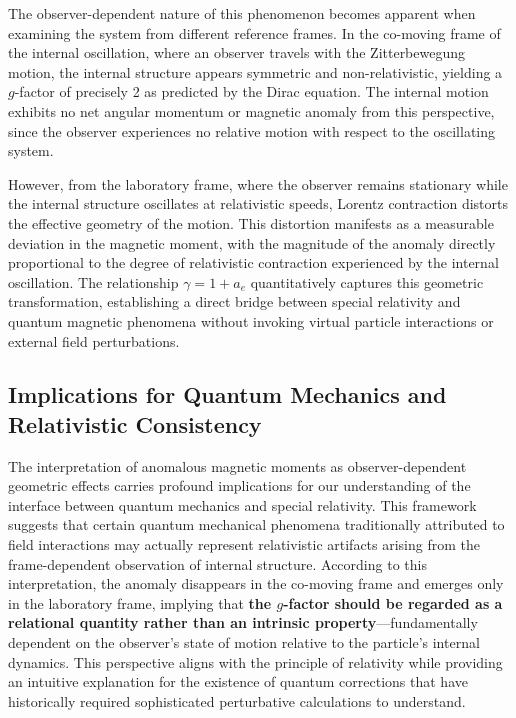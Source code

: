 \documentclass[%
 reprint,
 amsmath,amssymb,
 aps,
]{revtex4-1}
\numberwithin{equation}{section}%
\begin{document}
The observer-dependent nature of this phenomenon becomes apparent when examining the system from different reference frames. In the co-moving frame of the internal oscillation, where an observer travels with the Zitterbewegung motion, the internal structure appears symmetric and non-relativistic, yielding a $g$-factor of precisely 2 as predicted by the Dirac equation. The internal motion exhibits no net angular momentum or magnetic anomaly from this perspective, since the observer experiences no relative motion with respect to the oscillating system.

However, from the laboratory frame, where the observer remains stationary while the internal structure oscillates at relativistic speeds, Lorentz contraction distorts the effective geometry of the motion. This distortion manifests as a measurable deviation in the magnetic moment, with the magnitude of the anomaly directly proportional to the degree of relativistic contraction experienced by the internal oscillation. The relationship $\gamma = 1 + a_e$ quantitatively captures this geometric transformation, establishing a direct bridge between special relativity and quantum magnetic phenomena without invoking virtual particle interactions or external field perturbations.

\subsection{Implications for Quantum Mechanics and Relativistic Consistency}

The interpretation of anomalous magnetic moments as observer-dependent geometric effects carries profound implications for our understanding of the interface between quantum mechanics and special relativity. This framework suggests that certain quantum mechanical phenomena traditionally attributed to field interactions may actually represent relativistic artifacts arising from the frame-dependent observation of internal structure. According to this interpretation, the anomaly disappears in the co-moving frame and emerges only in the laboratory frame, implying that \textbf{the $g$-factor should be regarded as a relational quantity rather than an intrinsic property}---fundamentally dependent on the observer's state of motion relative to the particle's internal dynamics. This perspective aligns with the principle of relativity while providing an intuitive explanation for the existence of quantum corrections that have historically required sophisticated perturbative calculations to understand.
\end{document}
